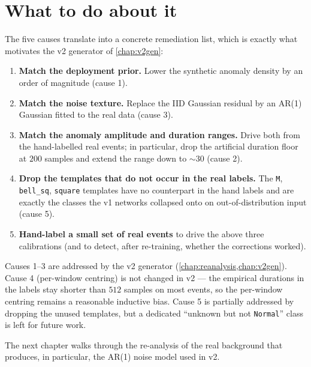 \section{What to do about it}
\label{sec:v1-remediation}

The five causes translate into a concrete remediation list, which is
exactly what motivates the v2 generator of \cref{chap:v2gen}:

\begin{enumerate}[leftmargin=*, itemsep=0.2em]
    \item \textbf{Match the deployment prior.} Lower the synthetic
    anomaly density by an order of magnitude (cause 1).
    \item \textbf{Match the noise texture.} Replace the IID Gaussian
    residual by an AR(1) Gaussian fitted to the real data (cause 3).
    \item \textbf{Match the anomaly amplitude and duration ranges.}
    Drive both from the hand-labelled real events; in particular, drop
    the artificial duration floor at $200$ samples and extend the
    range down to $\sim 30$ (cause 2).
    \item \textbf{Drop the templates that do not occur in the real
    labels.} The \texttt{M}, \texttt{bell\_sq}, \texttt{square}
    templates have no counterpart in the hand labels and are exactly
    the classes the v1 networks collapsed onto on out-of-distribution
    input (cause 5).
    \item \textbf{Hand-label a small set of real events} to drive the
    above three calibrations (and to detect, after re-training, whether
    the corrections worked).
\end{enumerate}

Causes 1--3 are addressed by the v2 generator
(\cref{chap:reanalysis,chap:v2gen}). Cause 4 (per-window centring) is
not changed in v2 --- the empirical durations in the labels stay
shorter than $512$ samples on most events, so the per-window centring
remains a reasonable inductive bias. Cause 5 is partially addressed by
dropping the unused templates, but a dedicated ``unknown but not
\texttt{Normal}'' class is left for future work.

The next chapter walks through the re-analysis of the real background
that produces, in particular, the AR(1) noise model used in v2.
